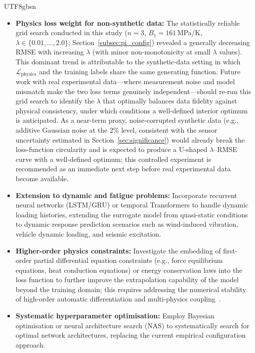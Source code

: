 \documentclass[a4paper,12pt]{report}
\newcommand{\Lphys}{\mathcal{L}_{\text{physics}}}
\begin{document}
\begin{CJK}{UTF8}{gbsn}
\begin{itemize}
  \item \textbf{Physics loss weight for non-synthetic data:} The statistically reliable
    grid search conducted in this study ($n=3$, $B_1=161$\,MPa/K,
    $\lambda \in \{0.01,\ldots,2.0\}$; Section~\ref{subsec:pi_config}) revealed a
    generally decreasing RMSE with increasing $\lambda$ (with minor non-monotonicity
    at small $\lambda$ values). This dominant trend is attributable
    to the synthetic-data setting in which $\Lphys$ and the training labels share the
    same generating function. Future work with real experimental data---where measurement
    noise and model mismatch make the two loss terms genuinely independent---should
    re-run this grid search to identify the $\lambda$ that optimally balances data
    fidelity against physical consistency, under which conditions a well-defined interior
    optimum is anticipated. As a near-term proxy, noise-corrupted synthetic data
    (e.g., additive Gaussian noise at the 2\% level, consistent with the sensor
    uncertainty estimated in Section~\ref{sec:significance}) would already break the
    loss-function circularity and is expected to produce a U-shaped $\lambda$--RMSE
    curve with a well-defined optimum; this controlled experiment is recommended as
    an immediate next step before real experimental data become available.
  \item \textbf{Extension to dynamic and fatigue problems:} Incorporate recurrent neural
    networks (LSTM/GRU) or temporal Transformers to handle dynamic loading histories,
    extending the surrogate model from quasi-static conditions to dynamic response
    prediction scenarios such as wind-induced vibration, vehicle dynamic loading,
    and seismic excitation.
  \item \textbf{Higher-order physics constraints:} Investigate the embedding of first-
    order partial differential equation constraints (e.g., force equilibrium equations,
    heat conduction equations) or energy conservation laws into the loss function to
    further improve the extrapolation capability of the model beyond the training domain;
    this requires addressing the numerical stability of high-order automatic
    differentiation and multi-physics coupling~\cite{lu2021deepxde}.
  \item \textbf{Systematic hyperparameter optimisation:} Employ Bayesian optimisation or
    neural architecture search (NAS) to systematically search for optimal network
    architectures, replacing the current empirical configuration approach.
\end{itemize}


\end{CJK}
\end{document}
